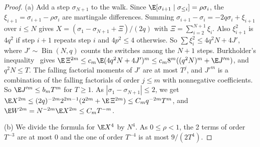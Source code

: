 \begin{proof}
(a) Add a step $\sigma_{N+1}$ to the walk. Since
$\E[\sigma_{i+1}\mid\sigma_{\le i}]=\rho\sigma_i$, the
$\xi_{i+1}=\sigma_{i+1}-\rho\sigma_i$ are martingale differences. Summing
$\sigma_{i+1}-\sigma_i=-2q\sigma_i+\xi_{i+1}$ over $i\le N$ gives
$X=(\sigma_1-\sigma_{N+1}+\Xi)/(2q)$ with $\Xi=\sum_{i=2}^{N+1}\xi_i$. Also
$\xi_{i+1}^2$ is $4q^2$ if step $i+1$ repeats step $i$ and $4p^2\le4$
otherwise. So $\sum\xi_i^2\le4q^2N+4J'$, where $J'\sim\operatorname{Bin}(N,q)$
counts the switches among the $N+1$ steps. Burkholder's
inequality~\cite[Ch.~2]{hallheyde1980} gives
$\E\,\Xi^{2m}\le c_m\E(4q^2N+4J')^m\le c_m8^m((q^2N)^m+\E J'^m)$, and
$q^2N\le T$. The falling factorial moments of $J'$ are at most $T^j$, and
$J'^m$ is a combination of the falling factorials of order $j\le m$ with
nonnegative coefficients. So
$\E J'^m\le b_mT^m$ for $T\ge1$. As $|\sigma_1-\sigma_{N+1}|\le2$,
we get $\E X^{2m}\le(2q)^{-2m}2^{2m-1}(2^{2m}+\E\,\Xi^{2m})\le C_mq^{-2m}T^m$,
and $\E W^{2m}=N^{-2m}\E X^{2m}\le C_mT^{-m}$.

(b) We divide the formula for $\E X^4$ by $N^4$. As $0\le\rho<1$, the 2 terms
of order $T^{-3}$ are at most $0$ and the one of order $T^{-4}$ is at most
$9/(2T^4)$.
\end{proof}


